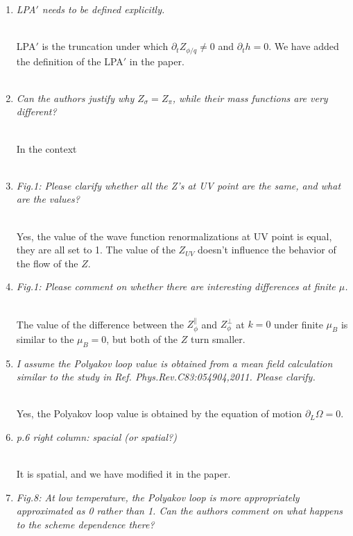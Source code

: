 \documentclass[aps,article,author-year,notitlepage,showpacs]{revtex4-1}
\begin{document}
\begin{enumerate}[1.]

\item {\it LPA$'$ needs to be defined explicitly. } \\[0.3ex] 
 
LPA$'$ is the truncation under which $\partial_tZ_{\phi/q}\neq 0$ and $\partial_th=0$. We have added the definition of the LPA$'$ in the paper.\\[0.3ex] 

\item {\it Can the authors justify why $Z_{\sigma} = Z_{\pi}$, while their mass functions are very different?} \\[0.3ex] 

In the context \\[0.3ex] 

\item {\it Fig.1: Please clarify whether all the Z's at UV point are the same, and what are the values?}\\[0.3ex] 

Yes, the value of the wave function renormalizations at UV point is equal, they are all set to 1. The value of the $Z_{UV}$ doesn't influence the behavior of the flow of the $Z$. \\[0.3ex]

\item {\it Fig.1: Please comment on whether there are interesting differences at finite $\mu$.}\\[0.3ex] 

The value of the difference between the $Z^{\|}_{\phi}$ and $Z^{\bot}_{\phi}$ at $k=0$ under finite $\mu_B$ is similar to the $\mu_B=0$, but both of the $Z$  turn smaller.

\item {\it I assume the Polyakov loop value is obtained from a mean field calculation similar
to the study in Ref. Phys.Rev.C83:054904,2011. Please clarify.}\\[0.3ex] 

Yes, the Polyakov loop value is obtained by the equation of motion $\partial_L\Omega=0$.

\item {\it p.6 right column: spacial (or spatial?)}\\[0.3ex] 

It is spatial, and we have modified it in the paper.

\item {\it Fig.8: At low temperature, the Polyakov loop is more appropriately approximated as 0 rather than 1. Can the authors comment on what happens to the scheme dependence there?}\\[0.3ex] 


\end{enumerate}
\end{document}
